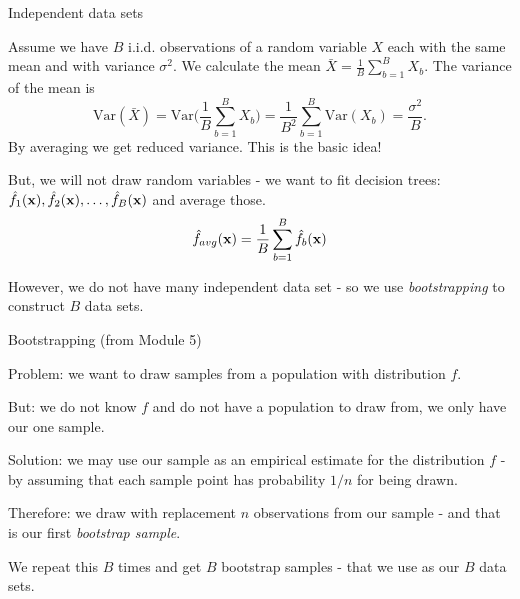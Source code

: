 \documentclass[10pt,ignorenonframetext,]{beamer}
\begin{document}
\begin{frame}

\begin{block}{Independent data sets}

Assume we have \(B\) i.i.d. observations of a random variable \(X\) each
with the same mean and with variance \(\sigma^2\). We calculate the mean
\(\bar{X} = \frac{1}{B} \sum_{b=1}^B X_b\). The variance of the mean is
\[\text{Var}(\bar{X}) = \text{Var}\Big(\frac{1}{B}\sum_{b=1}^B X_b \Big) = \frac{1}{B^2} \sum_{b=1}^B \text{Var}(X_b) = \frac{\sigma^2}{B}.\]
By averaging we get reduced variance. This is the basic idea!

But, we will not draw random variables - we want to fit decision trees:
\(\hat{f}_1({\bf x}),\hat{f}_2({\bf x}),\ldots, \hat{f}_B({\bf x})\) and
average those.
\[ \hat{f}_{avg}({\bf x})=\frac{1}{B}\sum_{b=1}^B \hat{f}_b({\bf x})\]

However, we do not have many independent data set - so we use
\emph{bootstrapping} to construct \(B\) data sets.

\end{block}

\end{frame}

\begin{frame}

\begin{block}{Bootstrapping (from Module 5)}

Problem: we want to draw samples from a population with distribution
\(f\).

But: we do not know \(f\) and do not have a population to draw from, we
only have our one sample.

Solution: we may use our sample as an empirical estimate for the
distribution \(f\) - by assuming that each sample point has probability
\(1/n\) for being drawn.

Therefore: we draw with replacement \(n\) observations from our sample -
and that is our first \emph{bootstrap sample}.

We repeat this \(B\) times and get \(B\) bootstrap samples - that we use
as our \(B\) data sets.

\end{block}

\end{frame}
\end{document}
